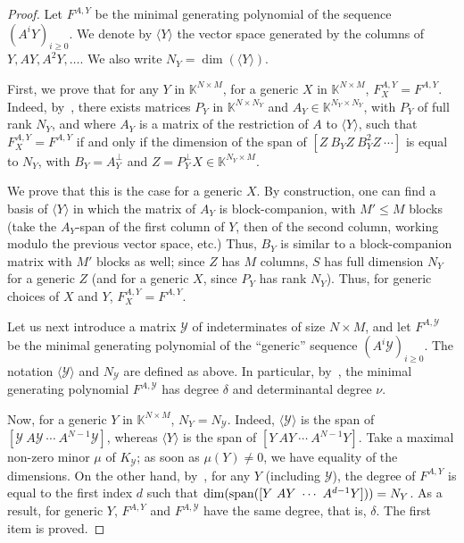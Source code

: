 \documentclass[12pt]{article}
\def\K{\mathbb{K}}
\def\scrY{\mathscr{Y}}
\begin{document}
\begin{proof}
Let $F^{A,Y}$ be the minimal generating polynomial of the sequence
$(A^i Y)_{i \ge 0}$.  We denote by $\langle Y \rangle$ the vector
space generated by the columns of $Y,AY,A^2Y,\dots$. We also write
$N_Y=\dim(\langle Y \rangle)$.

First, we prove that for any $Y$ in $\K^{N \times M}$, for a generic
$X$ in $\K^{N\times M}$, $F_X^{A,Y}=F^{A,Y}$.  Indeed,
by~\cite[Lemma~4.2]{Villard97a}, there exists matrices $P_Y$ in
$\K^{N\times N_Y}$ and $A_Y \in \K^{N_Y \times N_Y}$, with $P_Y$ of
full rank $N_Y$, and where $A_Y$ is a matrix of the restriction of $A$
to $\langle Y \rangle$, such that $F_X^{A,Y}=F^{A,Y}$ if and only if
the dimension of the span of $[Z ~ B_Y Z ~B_Y^2 Z ~ \cdots]$ is equal to
$N_Y$, with $B_Y=A_Y^\perp$ and $Z=P_Y^\perp X \in \K^{N_Y \times M}$.

We prove that this is the case for a generic $X$. By construction, one
can find a basis of $\langle Y \rangle$ in which the matrix of $A_Y$
is block-companion, with $M' \le M$ blocks (take the $A_Y$-span of the
first column of $Y$, then of the second column, working modulo the
previous vector space, etc.) Thus, $B_Y$ is similar to a
block-companion matrix with $M'$ blocks as well; since $Z$ has $M$
columns, $S$ has full dimension $N_Y$ for a generic $Z$ (and for a
generic $X$, since $P_Y$ has rank $N_Y$). Thus, for generic choices of
$X$ and $Y$, $F_X^{A,Y}=F^{A,Y}$.

Let us next introduce a matrix $\scrY$ of indeterminates of size $N
\times M$, and let $F^{A,\scrY}$ be the minimal generating polynomial
of the ``generic'' sequence $(A^i \scrY)_{i \ge 0}$. The notation
$\langle \scrY \rangle$ and $N_\scrY$ are defined as above.  In
particular, by~\cite[Proposition 6.1]{Villard97a}, the minimal
generating polynomial $F^{A,\scrY}$ has degree $\delta$ and
determinantal degree $\nu$.

Now, for a generic $Y$ in $\K^{N\times M}$, $N_Y=N_\scrY$. Indeed,
$\langle \scrY\rangle$ is the span of $[\scrY ~ A \scrY ~ \cdots ~
  A^{N-1} \scrY]$, whereas $\langle Y\rangle$ is the span of $[Y ~ A Y
  ~ \cdots ~A^{N-1} Y]$. Take a maximal non-zero minor $\mu$ of
$K_\scrY$; as soon as $\mu(Y)\ne 0$, we have equality of the
dimensions. On the other hand, by~\cite[Lemma~4.3]{Villard97a}, for
any $Y$ (including $\scrY$), the degree of $F^{A,Y}$ is equal to the
first index $d$ such that $\dim({\rm span}([Y ~ A Y ~ \cdots ~A^{d-1}
  Y]))=N_Y$. As a result, for generic $Y$, $F^{A,Y}$ and $F^{A,\scrY}$
have the same degree, that is, $\delta$.  The first item is proved.


\end{proof}
\end{document}
